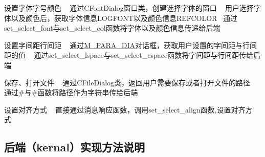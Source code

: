 \begin{DoxyEnumerate}
\item 设置字体字号颜色 ~\newline
通过{\ttfamily C\+Font\+Dialog}窗口类，创建选择字体的窗口 ~\newline
用户选择字体以及颜色后，获取字体信息{\ttfamily L\+O\+G\+F\+O\+NT}以及颜色信息{\ttfamily R\+E\+F\+C\+O\+L\+OR}~\newline
通过{\ttfamily set\+\_\+select\+\_\+font}与{\ttfamily set\+\_\+select\+\_\+col}函数将字体以及颜色信息传递给后端~\newline

\item 设置字间距行间距 ~\newline
通过{\ttfamily \hyperlink{class_m___p_a_r_a___d_i_a}{M\+\_\+\+P\+A\+R\+A\+\_\+\+D\+IA}}对话框，获取用户设置的字间距与行间距的值 ~\newline
通过{\ttfamily set\+\_\+select\+\_\+lspace}与{\ttfamily set\+\_\+select\+\_\+cspace}函数将字间距与行间距传给后端~\newline

\item 保存、打开文件 ~\newline
通过{\ttfamily C\+File\+Dialog}类，返回用户需要保存或者打开文件的路径~\newline
通过{\ttfamily \#}与{\ttfamily \#}函数将路径作为字符串传给后端~\newline

\item 设置对齐方式 ~\newline
直接通过消息响应函数，调用{\ttfamily set\+\_\+select\+\_\+align}函数,设置对齐方式~\newline

\end{DoxyEnumerate}

\subsection*{后端（kernal）实现方法说明 }


